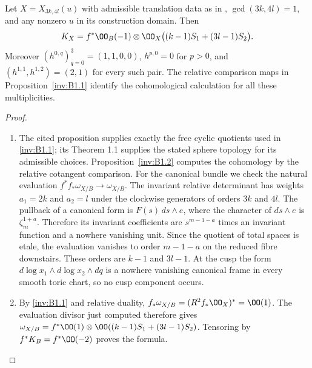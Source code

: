 \begin{proposition}\hypertarget{tag-01S5}{}\label{inv:B2.1}

Let $X=X_{3k,4l}(u)$ with admissible translation data as in
\citet[Theorem~1.1, p.~1, and Proposition~2.3, pp.~5--6]{ViaclovskyLog2026},
$\gcd(3k,4l)=1$, and any nonzero $u$ in its construction domain.
Then
\[
K_X=f^*\OO_B(-1)\otimes
\OO_X\bigl((k-1)S_1+(3l-1)S_2\bigr).
\]
Moreover $(h^{0,q})_{q=0}^3=(1,1,0,0)$, $h^{p,0}=0$ for $p>0$,
and $(h^{1,1},h^{1,2})=(2,1)$ for every such pair.
The relative comparison maps in Proposition~\ref{inv:B1.1}
identify the cohomological calculation for all these multiplicities.
\end{proposition}


\begin{proof}
\begin{enumerate}[label=\arabic*.,leftmargin=*]
\item The cited proposition supplies exactly the free cyclic quotients used
in \ref{inv:B1.1}; its Theorem 1.1 supplies the stated sphere topology for its
admissible choices. Proposition~\ref{inv:B1.2} computes the cohomology by the relative
cotangent comparison.
For the canonical bundle we check the natural evaluation
$f^*f_*\omega_{X/B}\to\omega_{X/B}$.
The invariant relative determinant has weights $a_1=2k$ and $a_2=l$
under the clockwise generators of orders $3k$ and $4l$. The pullback
of a canonical form is $F(s)\,ds\wedge e$, where the character of
$ds\wedge e$ is $\zeta_m^{1+a}$. Therefore its invariant coefficients
are $s^{m-1-a}$ times an invariant function and a nowhere vanishing
unit. Since the quotient of total spaces is etale, the evaluation
vanishes to order $m-1-a$ on the reduced fibre downstairs. These orders
are $k-1$ and $3l-1$. At the cusp the form
$d\log x_1\wedge d\log x_2\wedge dq$ is a nowhere vanishing canonical
frame in every smooth toric chart, so no cusp component occurs.

\item By \ref{inv:B1.1} and relative duality,
$f_*\omega_{X/B}=(R^2f_*\OO_X)^*=\OO(1)$.
The evaluation divisor just computed therefore gives
$\omega_{X/B}=f^*\OO(1)\otimes
\OO((k-1)S_1+(3l-1)S_2)$. Tensoring by $f^*K_B=f^*\OO(-2)$
proves the formula.
\end{enumerate}
\end{proof}